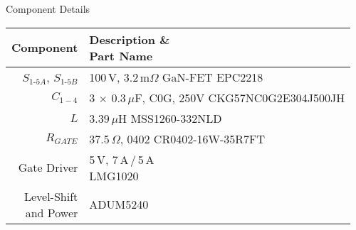 

  {\renewcommand{\arraystretch}{2.3}
\footnotesize
		\centering
        \captionsetup{type=table} %
		\caption{Component Details}

		\begin{tabular}{rl}
            \toprule
            Component & \makecell[l]{Description \& \\ Part Name} \\
            \midrule
            $S_{1\textrm{-}5A}$, $S_{1\textrm{-}5B}$    & \makecell[l]{100\,V, 3.2\,m$\Omega$ GaN-FET \\ EPC2218} \\
            $C_{1-4}$                                   & \makecell[l]{3 $\times$ 0.3\,$\mu$F, C0G, 250V \\ CKG57NC0G2E304J500JH} \\
            $L$                                         & \makecell[l]{3.39\,$\mu$H \\ MSS1260-332NLD} \\
            $R_{GATE}$                                  & \makecell[l]{37.5\,$\Omega$, 0402 \\ CR0402-16W-35R7FT} \\
            Gate Driver                                 & \makecell[l]{5\,V, 7\,A\,/\,5\,A \\ LMG1020} \\
            \makecell[r]{Level-Shift \\ and Power} & ADUM5240\\
            \bottomrule
        \end{tabular}

}%

